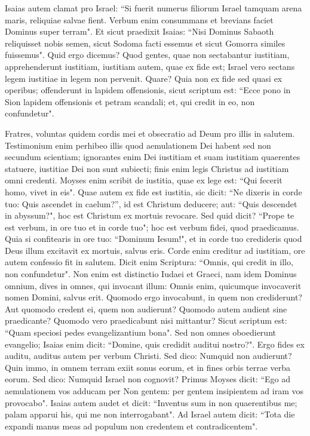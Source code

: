 \begin{biblechapter}
\verse Isaias autem clamat pro Israel: “Si fuerit numerus filiorum Israel tamquam arena maris, reliquiae salvae fient. 
\verse Verbum enim consummans et brevians faciet Dominus super terram". 
\verse Et sicut praedixit Isaias: “Nisi Dominus Sabaoth reliquisset nobis semen, sicut Sodoma facti essemus et sicut Gomorra similes fuissemus". 
\verse Quid ergo dicemus? Quod gentes, quae non sectabantur iustitiam, apprehenderunt iustitiam, iustitiam autem, quae ex fide est; 
\verse Israel vero sectans legem iustitiae in legem non pervenit. 
\verse Quare? Quia non ex fide sed quasi ex operibus; offenderunt in lapidem offensionis, 
\verse sicut scriptum est: “Ecce pono in Sion lapidem offensionis et petram scandali; et, qui credit in eo, non confundetur". 
\end{biblechapter}

\begin{biblechapter}  
\verse Fratres, voluntas quidem cordis mei et obsecratio ad Deum pro illis in salutem. 
\verse Testimonium enim perhibeo illis quod aemulationem Dei habent sed non secundum scientiam; 
\verse ignorantes enim Dei iustitiam et suam iustitiam quaerentes statuere, iustitiae Dei non sunt subiecti; 
\verse finis enim legis Christus ad iustitiam omni credenti. 
\verse Moyses enim scribit de iustitia, quae ex lege est: “Qui fecerit homo, vivet in eis". 
\verse Quae autem ex fide est iustitia, sic dicit: “Ne dixeris in corde tuo: Quis ascendet in caelum?”, id est Christum deducere; 
\verse aut: “Quis descendet in abyssum?", hoc est Christum ex mortuis revocare. 
\verse Sed quid dicit? “Prope te est verbum, in ore tuo et in corde tuo"; hoc est verbum fidei, quod praedicamus. 
\verse Quia si confitearis in ore tuo: “Dominum Iesum!", et in corde tuo credideris quod Deus illum excitavit ex mortuis, salvus eris.  
\verse Corde enim creditur ad iustitiam, ore autem confessio fit in salutem. 
\verse Dicit enim Scriptura: “Omnis, qui credit in illo, non confundetur". 
\verse Non enim est distinctio Iudaei et Graeci, nam idem Dominus omnium, dives in omnes, qui invocant illum: 
\verse Omnis enim, quicumque invocaverit nomen Domini, salvus erit. 
\verse Quomodo ergo invocabunt, in quem non crediderunt? Aut quomodo credent ei, quem non audierunt? Quomodo autem audient sine praedicante? 
\verse Quomodo vero praedicabunt nisi mittantur? Sicut scriptum est: “Quam speciosi pedes evangelizantium bona". 
\verse Sed non omnes oboedierunt evangelio; Isaias enim dicit: “Domine, quis credidit auditui nostro?". 
\verse Ergo fides ex auditu, auditus autem per verbum Christi. 
\verse Sed dico: Numquid non audierunt? Quin immo, in omnem terram exiit sonus eorum, et in fines orbis terrae verba eorum. 
\verse Sed dico: Numquid Israel non cognovit? Primus Moyses dicit: “Ego ad aemulationem vos adducam per Non gentem: per gentem insipientem ad iram vos provocabo". 
\verse Isaias autem audet et dicit: “Inventus sum in non quaerentibus me; palam apparui his, qui me non interrogabant". 
\verse Ad Israel autem dicit: “Tota die expandi manus meas ad populum non credentem et contradicentem". 
\end{biblechapter}

